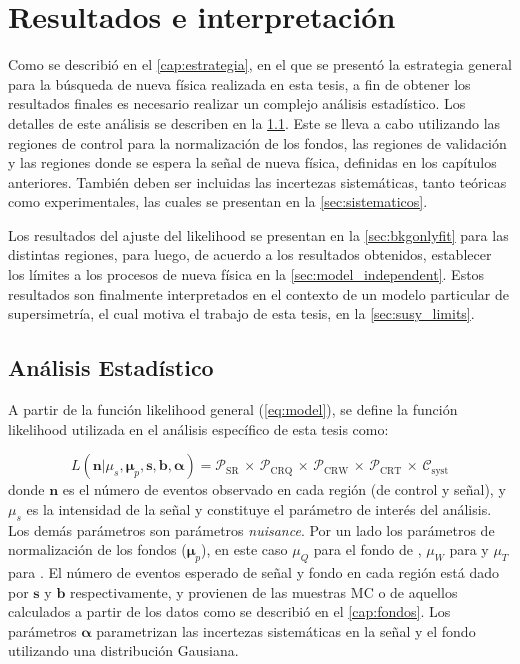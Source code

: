 \chapter{Resultados e interpretación}
\label{cap:resultados}

Como se describió en el \cref{cap:estrategia}, en el que se presentó la
estrategia general para la búsqueda de nueva física realizada en esta tesis, a
fin de obtener los resultados finales es necesario realizar un complejo análisis
estadístico. Los detalles de este análisis se describen en la
\cref{sec:analisis}. Este se lleva a cabo utilizando las regiones de control
para la normalización de los fondos, las regiones de validación y las regiones
donde se espera la señal de nueva física, definidas en los capítulos anteriores.
También deben ser incluidas las incertezas sistemáticas, tanto teóricas como
experimentales, las cuales se presentan en la \cref{sec:sistematicos}.

Los resultados del ajuste del likelihood se presentan en la
\cref{sec:bkgonlyfit} para las distintas regiones, para luego, de acuerdo a los
resultados obtenidos, establecer los límites a los procesos de nueva física en
la \cref{sec:model_independent}. Estos resultados son finalmente interpretados
en el contexto de un modelo particular de supersimetría, el cual motiva el
trabajo de esta tesis, en la \cref{sec:susy_limits}.



\section{Análisis Estadístico}
\label{sec:analisis}

A partir de la función likelihood general (\cref{eq:model}), se define la
función likelihood utilizada en el análisis específico de esta tesis como:

\begin{equation}
  L(\bm{n}|\mu_s, \bm{\mu}_p, \bm{s}, \bm{b}, \bm{\alpha}) = \mathcal{P}_\text{SR} \, \times \, \mathcal{P}_\text{CRQ} \, \times \, \mathcal{P}_\text{CRW} \, \times \, \mathcal{P}_\text{CRT} \, \times \, \mathcal{C}_\text{syst}
  \label{eq:likelihood}
\end{equation}
%
donde $\bm{n}$ es el número de eventos observado en cada región (de control y
señal), y $\mu_s$ es la intensidad de la señal y constituye el parámetro de
interés del análisis. Los demás parámetros son parámetros \emph{nuisance}. Por
un lado los parámetros de normalización de los fondos ($\bm{\mu}_p$), en este
caso $\mu_Q$ para el fondo de {\gjet}, $\mu_W$ para {\wgam} y $\mu_T$ para
{\ttgam}. El número de eventos esperado de señal y fondo en cada región está
dado por $\bm{s}$ y $\bm{b}$ respectivamente, y provienen de las muestras MC o
de aquellos calculados a partir de los datos como se describió en el
\cref{cap:fondos}. Los parámetros $\bm{\alpha}$ parametrizan las incertezas
sistemáticas en la señal y el fondo utilizando una distribución Gausiana.

